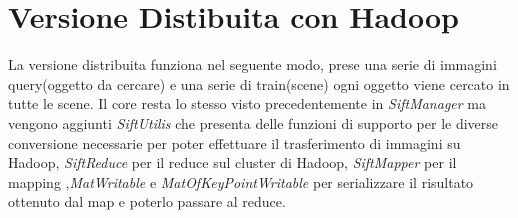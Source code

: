 \section{Versione Distibuita con Hadoop}
La versione distribuita funziona nel seguente modo, prese una serie di immagini query(oggetto da cercare) e una serie di train(scene) ogni oggetto viene cercato in tutte le scene. Il core resta lo stesso visto precedentemente in \emph{\textit{SiftManager}} ma vengono aggiunti \emph{\textit{SiftUtilis}} che presenta delle funzioni di supporto per le diverse conversione necessarie per poter effettuare il trasferimento di immagini su Hadoop, \emph{\textit{SiftReduce}} per il reduce sul cluster di Hadoop, \emph{\textit{SiftMapper}} per il mapping ,\emph{\textit{MatWritable}} e \emph{\textit{MatOfKeyPointWritable}} per serializzare il risultato ottenuto dal map e poterlo passare al reduce.
